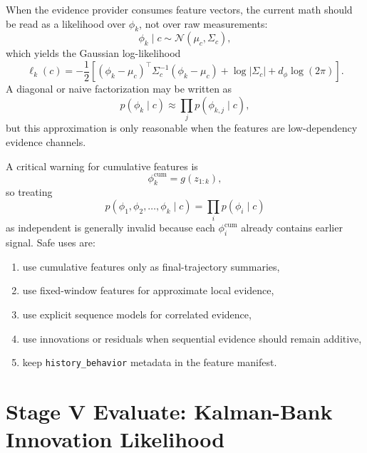 \documentclass[11pt]{article}
\begin{document}
\noindent
When the evidence provider consumes feature vectors, the current math should be read as a likelihood over \(\phi_k\), not over raw measurements:
\begin{equation}
\phi_k \mid c \sim \mathcal{N}(\mu_c, \Sigma_c),
\end{equation}
which yields the Gaussian log-likelihood
\begin{equation}
\ell_k(c)
=
-\frac{1}{2}
\left[
(\phi_k-\mu_c)^\top \Sigma_c^{-1} (\phi_k-\mu_c)
+
\log |\Sigma_c|
+
d_\phi \log(2\pi)
\right].
\end{equation}
A diagonal or naive factorization may be written as
\begin{equation}
p(\phi_k \mid c) \approx \prod_j p(\phi_{k,j} \mid c),
\end{equation}
but this approximation is only reasonable when the features are low-dependency evidence channels.

A critical warning for cumulative features is
\begin{equation}
\phi_k^{\mathrm{cum}} = g(z_{1:k}),
\end{equation}
so treating
\begin{equation}
p(\phi_1,\phi_2,\dots,\phi_k \mid c)
=
\prod_i p(\phi_i \mid c)
\end{equation}
as independent is generally invalid because each \(\phi_i^{\mathrm{cum}}\) already contains earlier signal. Safe uses are:
\begin{enumerate}[leftmargin=1.5em]
  \item use cumulative features only as final-trajectory summaries,
  \item use fixed-window features for approximate local evidence,
  \item use explicit sequence models for correlated evidence,
  \item use innovations or residuals when sequential evidence should remain additive,
  \item keep \texttt{history\_behavior} metadata in the feature manifest.
\end{enumerate}

\section{Stage V Evaluate: Kalman-Bank Innovation Likelihood}
\end{document}
